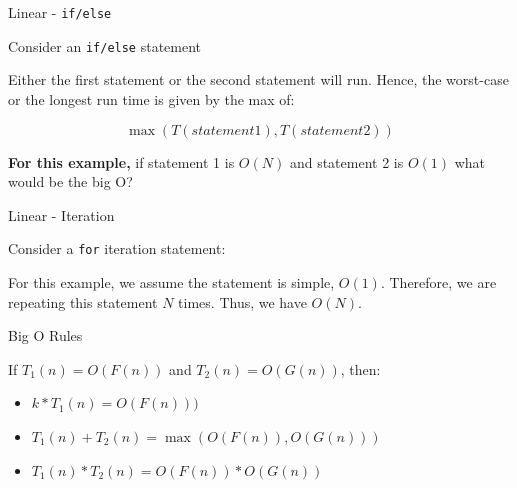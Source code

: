 \begin{frame}[fragile]{Linear - \texttt{if/else}}

Consider an \texttt{if/else} statement

\begin{Shaded}
\begin{Highlighting}[]
\NormalTok{\}}
\end{Highlighting}
\end{Shaded}

Either the first statement or the second statement will run. Hence, the
worst-case or the longest run time is given by the max of:

\[\max (T(statement 1), T(statement 2))\]

\textbf{For this example,} if statement 1 is \(O(N)\) and statement 2 is
\(O(1)\) what would be the big O?

\end{frame}

\begin{frame}[fragile]{Linear - Iteration}

Consider a \texttt{for} iteration statement:

\begin{Shaded}
\begin{Highlighting}[]
\NormalTok{\}}
\end{Highlighting}
\end{Shaded}

For this example, we assume the statement is simple, \(O(1)\).
Therefore, we are repeating this statement \(N\) times. Thus, we have
\(O(N)\).

\end{frame}

\begin{frame}{Big O Rules}

If \(T_1(n) = O(F(n))\) and \(T_2(n) = O(G(n))\), then:

\begin{itemize}
\tightlist
\item
  \(k*T_1(n) = O(F(n)))\)
\item
  \(T_1(n) + T_2(n) = \max (O(F(n)), O(G(n)))\)
\item
  \(T_1(n) * T_2(n) = O(F(n)) * O(G(n))\)
\end{itemize}

\end{frame}

